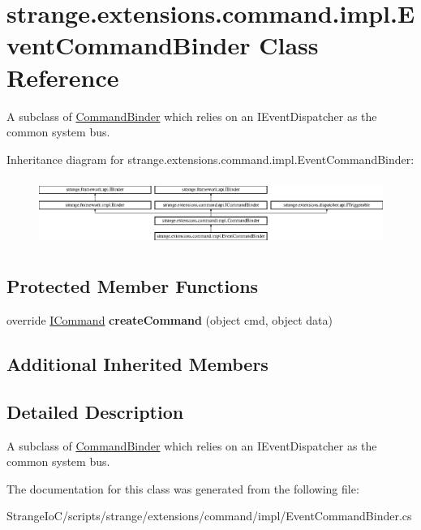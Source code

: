\hypertarget{classstrange_1_1extensions_1_1command_1_1impl_1_1_event_command_binder}{\section{strange.\-extensions.\-command.\-impl.\-Event\-Command\-Binder Class Reference}
\label{classstrange_1_1extensions_1_1command_1_1impl_1_1_event_command_binder}
}


A subclass of \hyperlink{classstrange_1_1extensions_1_1command_1_1impl_1_1_command_binder}{Command\-Binder} which relies on an I\-Event\-Dispatcher as the common system bus.  


Inheritance diagram for strange.\-extensions.\-command.\-impl.\-Event\-Command\-Binder\-:\begin{figure}[H]
\begin{center}
\leavevmode
\includegraphics[height=2.222222cm]{classstrange_1_1extensions_1_1command_1_1impl_1_1_event_command_binder}
\end{center}
\end{figure}
\subsection*{Protected Member Functions}
\begin{DoxyCompactItemize}
\item 
\hypertarget{classstrange_1_1extensions_1_1command_1_1impl_1_1_event_command_binder_a94afde29529aaad8582557d7760d74a0}{override \hyperlink{interfacestrange_1_1extensions_1_1command_1_1api_1_1_i_command}{I\-Command} {\bfseries create\-Command} (object cmd, object data)}\label{classstrange_1_1extensions_1_1command_1_1impl_1_1_event_command_binder_a94afde29529aaad8582557d7760d74a0}

\end{DoxyCompactItemize}
\subsection*{Additional Inherited Members}


\subsection{Detailed Description}
A subclass of \hyperlink{classstrange_1_1extensions_1_1command_1_1impl_1_1_command_binder}{Command\-Binder} which relies on an I\-Event\-Dispatcher as the common system bus. 

The documentation for this class was generated from the following file\-:\begin{DoxyCompactItemize}
\item 
Strange\-Io\-C/scripts/strange/extensions/command/impl/Event\-Command\-Binder.\-cs\end{DoxyCompactItemize}
